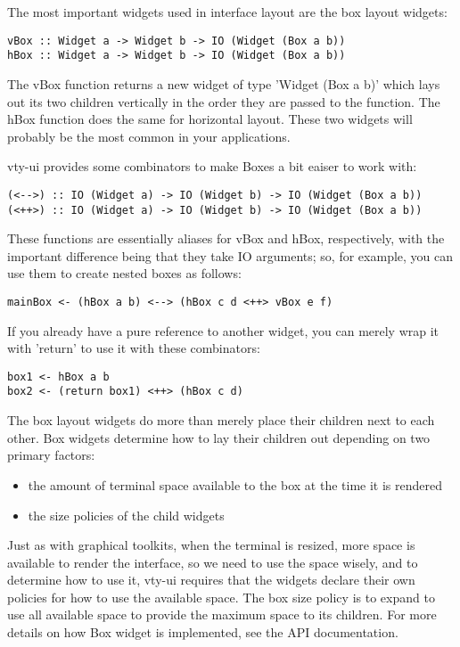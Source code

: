 \documentclass[11pt, letterpaper, oneside, titlepage]{article}
\begin{document}
The most important widgets used in interface layout are the box layout
widgets:

\begin{verbatim}
vBox :: Widget a -> Widget b -> IO (Widget (Box a b))
hBox :: Widget a -> Widget b -> IO (Widget (Box a b))
\end{verbatim}

The vBox function returns a new widget of type 'Widget (Box a b)' which
lays out its two children vertically in the order they are passed to the
function.  The hBox function does the same for horizontal layout.  These
two widgets will probably be the most common in your applications.

vty-ui provides some combinators to make Boxes a bit eaiser to work
with:

\begin{verbatim}
(<-->) :: IO (Widget a) -> IO (Widget b) -> IO (Widget (Box a b))
(<++>) :: IO (Widget a) -> IO (Widget b) -> IO (Widget (Box a b))
\end{verbatim}

These functions are essentially aliases for vBox and hBox, respectively,
with the important difference being that they take IO arguments; so, for
example, you can use them to create nested boxes as follows:

\begin{verbatim}
mainBox <- (hBox a b) <--> (hBox c d <++> vBox e f)
\end{verbatim}

If you already have a pure reference to another widget, you can merely
wrap it with 'return' to use it with these combinators:

\begin{verbatim}
box1 <- hBox a b
box2 <- (return box1) <++> (hBox c d)
\end{verbatim}

The box layout widgets do more than merely place their children next to
each other.  Box widgets determine how to lay their children out
depending on two primary factors:

\begin{itemize}
\item the amount of terminal space available to the box at the time it
      is rendered
\item the size policies of the child widgets
\end{itemize}

Just as with graphical toolkits, when the terminal is resized, more
space is available to render the interface, so we need to use the space
wisely, and to determine how to use it, vty-ui requires that the widgets
declare their own policies for how to use the available space.  The box
size policy is to expand to use all available space to provide the
maximum space to its children.  For more details on how Box widget is
implemented, see the API documentation.
\end{document}

